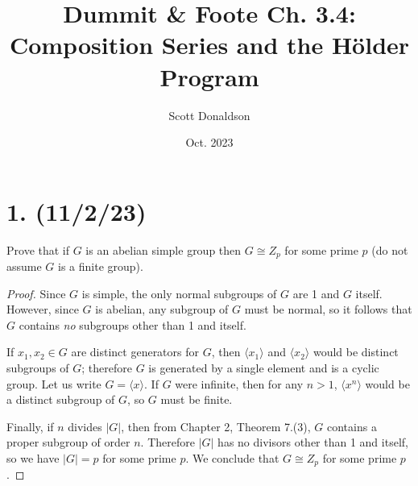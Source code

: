 \documentclass{article}
\title{Dummit \& Foote Ch. 3.4: Composition Series and the Hölder Program}
\author{Scott Donaldson}
\date{Oct. 2023}
\begin{document}
\maketitle

\section*{1. (11/2/23)}

Prove that if $G$ is an abelian simple group then $G \cong Z_p$ for some prime $p$ (do not assume $G$ is a finite group).

\begin{proof}
    Since $G$ is simple, the only normal subgroups of $G$ are 1 and $G$ itself. However, since $G$ is abelian, any subgroup of $G$ must be normal, so it follows that $G$ contains \emph{no} subgroups other than 1 and itself.

    If $x_1, x_2 \in G$ are distinct generators for $G$, then $\langle x_1 \rangle$ and $\langle x_2 \rangle$ would be distinct subgroups of $G$; therefore $G$ is generated by a single element and is a cyclic group. Let us write $G = \langle x \rangle$. If $G$ were infinite, then for any $n > 1$, $\langle x^n \rangle$ would be a distinct subgroup of $G$, so $G$ must be finite.

    Finally, if $n$ divides $|G|$, then from Chapter 2, Theorem 7.(3), $G$ contains a proper subgroup of order $n$. Therefore $|G|$ has no divisors other than 1 and itself, so we have $|G| = p$ for some prime $p$. We conclude that $G \cong Z_p$ for some prime $p$.
\end{proof}
\end{document}
